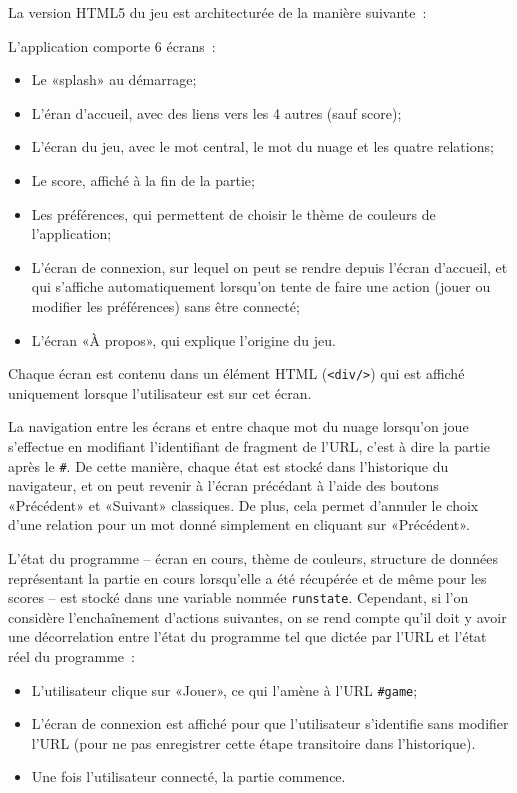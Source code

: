 \documentclass[a4paper,11pt,french]{article}
\begin{document}
La version HTML5 du jeu est architecturée de la manière suivante~:

L'application comporte 6 écrans~:
\begin{itemize}
\item Le «splash» au démarrage;
\item L'éran d'accueil, avec des liens vers les 4 autres (sauf score);
\item L'écran du jeu, avec le mot central, le mot du nuage et les quatre relations;
\item Le score, affiché à la fin de la partie;
\item Les préférences, qui permettent de choisir le thème de couleurs de l'application;
\item L'écran de connexion, sur lequel on peut se rendre depuis l'écran d'accueil, et qui s'affiche automatiquement lorsqu'on tente de faire
  une action (jouer ou modifier les préférences) sans être connecté;
\item L'écran «À propos», qui explique l'origine du jeu.
\end{itemize}
Chaque écran est contenu dans un élément HTML (\verb!<div/>!) qui est affiché uniquement lorsque l'utilisateur est sur cet écran.

La navigation entre les écrans et entre chaque mot du nuage lorsqu'on joue s'effectue en modifiant l'identifiant de fragment
de l'URL, c'est à dire la partie après le \verb!#!. De cette manière, chaque état est stocké dans l'historique du navigateur, et on peut revenir à
l'écran précédant à l'aide des boutons «Précédent» et «Suivant» classiques. De plus, cela permet d'annuler le choix d'une relation pour
un mot donné simplement en cliquant sur «Précédent».

L'état du programme -- écran en cours, thème de couleurs, structure de données représentant la partie en cours lorsqu'elle a été récupérée et de même pour les scores -- est stocké dans une variable nommée \verb!runstate!. Cependant, si l'on considère l'enchaînement d'actions
suivantes, on se rend compte qu'il doit y avoir une décorrelation entre l'état du programme tel que dictée par l'URL et l'état réel du
programme~:

\begin{itemize}
\item L'utilisateur clique sur «Jouer», ce qui l'amène à l'URL \verb!#game!;
\item L'écran de connexion est affiché pour que l'utilisateur s'identifie sans modifier l'URL (pour ne pas enregistrer cette étape
  transitoire dans l'historique).
\item Une fois l'utilisateur connecté, la partie commence.
\end{itemize}
\end{document}
